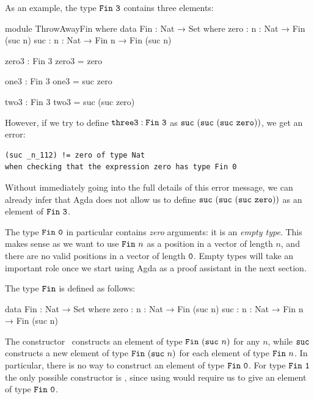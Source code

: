 \documentclass[a4paper,UKenglish]{tufte-handout}
\theoremstyle{definition}
\newcommand\fun[1]{{\AgdaFunction{#1}}}
\newcommand\data[1]{{\AgdaFunction{#1}}}
\newcommand\con[1]{{\AgdaInductiveConstructor{#1}}}
\newcommand\lit[1]{{\AgdaNumber{#1}}}
\newcommand\zero{\con{zero}}
\newcommand\suc{\con{suc}}
\newcommand\Fin{\data{Fin}}
\begin{document}
As an example, the type $\Fin\ \lit{3}$ contains three elements:
\begin{code}[hide]
module ThrowAwayFin where
  data Fin : Nat → Set where
    zero  : {n : Nat} → Fin (suc n)
    suc   : {n : Nat} → Fin n → Fin (suc n)
\end{code}
\begin{code}[number]
  zero3 : Fin 3
  zero3 = zero

  one3 : Fin 3
  one3   = suc zero

  two3 : Fin 3
  two3   = suc (suc zero)
\end{code}
However, if we try to define $\fun{three3} : \Fin\ \lit{3}$ as
$\suc\ (\suc\ (\suc\ \zero))$, we get an error:
\begin{verbatim}
(suc _n_112) != zero of type Nat
when checking that the expression zero has type Fin 0
\end{verbatim}
Without immediately going into the full details of this error message,
we can already infer that Agda does not allow us to
define $\suc\ (\suc\ (\suc\ \zero))$ as an element of $\Fin\ \lit{3}$.

The type $\Fin\ \lit{0}$ in particular
contains \emph{zero} arguments: it is an \emph{empty type}.
This makes sense as we want to use $\Fin\ n$ as a position
in a vector of length $n$, and there are no valid positions
in a vector of length $\lit{0}$. Empty types will take an important role once
we start using Agda as a proof assistant in the next section.

The type $\Fin$ is defined as follows:
\begin{code}[number]
data Fin : Nat → Set where
  zero  : {n : Nat} → Fin (suc n)
  suc   : {n : Nat} → Fin n → Fin (suc n)
\end{code}
The constructor \zero\ constructs
an element of type $\data{Fin}~(\suc\ n)$ for any $n$,
while $\suc$ constructs a new element of type $\data{Fin}\
(\suc\ n)$ for each element of type $\data{Fin}\ n$.
In particular, there is no way
to construct an element of type $\data{Fin}\ \lit{0}$.
For type $\Fin\ \lit{1}$ the only possible constructor is \zero, since
using \suc{} would require us to give an element of type $\Fin\ \lit{0}$.
\end{document}
